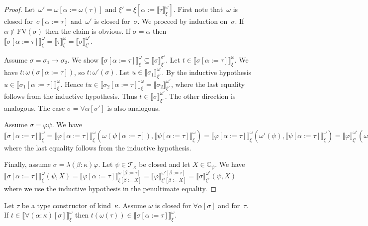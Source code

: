 \documentclass[runningheads,a4paper]{llncs}
\newcommand{\arrtype}{\rightarrow}
\newcommand{\subst}[2]{#1:=#2}
\newcommand{\FV}{\mathrm{FV}}
\newcommand{\Tc}{\mathcal{T}}
\newcommand{\Cb}{\mathbb{C}}
\newcommand{\val}[3]{\ensuremath{\llbracket#1\rrbracket_{#2}^{#3}}}
\begin{document}
\begin{proof}
  Let~$\omega' = \omega[\subst{\alpha}{\omega(\tau)}]$ and $\xi' =
  \xi[\subst{\alpha}{\val{\tau}{\xi}{\omega}}]$. First note
  that~$\omega$ is closed for~$\sigma[\subst{\alpha}{\tau}]$
  and~$\omega'$ is closed for~$\sigma$. We proceed by induction
  on~$\sigma$. If $\alpha \notin \FV(\sigma)$ then the claim is
  obvious. If $\sigma = \alpha$ then
  $\val{\sigma[\subst{\alpha}{\tau}]}{\xi}{\omega} =
  \val{\tau}{\xi}{\omega} = \val{\sigma}{\xi'}{\omega'}$.

  Assume $\sigma = \sigma_1\arrtype\sigma_2$. We show
  $\val{\sigma[\subst{\alpha}{\tau}]}{\xi}{\omega} \subseteq
  \val{\sigma}{\xi'}{\sigma'}$. Let $t \in
  \val{\sigma[\subst{\alpha}{\tau}]}{\xi}{\omega}$. We have $t :
  \omega(\sigma[\subst{\alpha}{\tau}])$, so $t : \omega'(\sigma)$. Let
  $u \in \val{\sigma_1}{\xi'}{\omega'}$. By the inductive hypothesis
  $u \in \val{\sigma_1[\subst{\alpha}{\tau}]}{\xi}{\omega}$. Hence $t
  u \in \val{\sigma_2[\subst{\alpha}{\tau}]}{\xi}{\omega} =
  \val{\sigma_2}{\xi'}{\omega'}$, where the last equality follows from
  the inductive hypothesis. Thus $t \in
  \val{\sigma}{\xi'}{\omega'}$. The other direction is analogous. The
  case $\sigma = \forall\alpha[\sigma']$ is also analogous.

  Assume $\sigma = \varphi\psi$. We have
  $\val{\sigma[\subst{\alpha}{\tau}]}{\xi}{\omega} =
  \val{\varphi[\subst{\alpha}{\tau}]}{\xi}{\omega}(\omega(\psi[\subst{\alpha}{\tau}]),
  \val{\psi[\subst{\alpha}{\tau}]}{\xi}{\omega}) =
  \val{\varphi[\subst{\alpha}{\tau}]}{\xi}{\omega}(\omega'(\psi),
  \val{\psi[\subst{\alpha}{\tau}]}{\xi}{\omega}) =
  \val{\varphi}{\xi'}{\omega'}(\omega'(\psi),
  \val{\psi}{\xi'}{\omega'})$ where the last equality follows from the
  inductive hypothesis.

  Finally, assume $\sigma = \lambda(\beta:\kappa)\varphi$. Let $\psi
  \in \Tc_\kappa$ be closed and let $X \in \Cb_\psi$. We have
  $\val{\sigma[\subst{\alpha}{\tau}]}{\xi}{\omega}(\psi,X) =
  \val{\varphi[\subst{\alpha}{\tau}]}{\xi[\subst{\beta}{X}]}{\omega[\subst{\beta}{\tau}]}
  =
  \val{\varphi}{\xi'[\subst{\beta}{X}]}{\omega'[\subst{\beta}{\tau}]}
  = \val{\sigma}{\xi'}{\omega'}(\psi,X)$ where we use the inductive
  hypothesis in the penultimate equality.
\end{proof}

\begin{lemma}\label{lem_forall}
  Let $\tau$ be a type constructor of kind~$\kappa$. Assume $\omega$
  is closed for $\forall\alpha[\sigma]$ and for~$\tau$. If $t \in
  \val{\forall(\alpha:\kappa)[\sigma]}{\xi}{\omega}$ then $t
  (\omega(\tau)) \in \val{\sigma[\subst{\alpha}{\tau}]}{\xi}{\omega}$.
\end{lemma}
\end{document}
